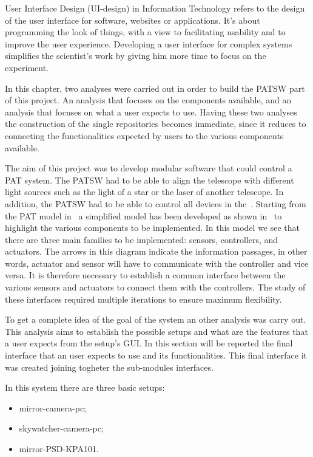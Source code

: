 User Interface Design (UI-design) in Information Technology refers to the design of the user interface for software, websites or applications. It’s about programming the look of things, with a view to facilitating usability and to improve the user experience. Developing a user interface for complex systems simplifies the scientist’s work by giving him more time to focus on the experiment.

In this chapter, two analyses were carried out in order to build the PATSW part of this project. An analysis that focuses on the components available, and an analysis that focuses on what a user expects to use. Having these two analyses the construction of the single repositories becomes immediate, since it reduces to connecting the functionalities expected by users to the various components available.


The aim of this project was to develop modular software that could control a PAT system. The PATSW had to be able to align the telescope with different light sources such as the light of a star or the laser of another telescope.
In addition, the PATSW had to be able to control all devices in the~.
Starting from the PAT model in~ a simplified model has been developed as shown in~ to highlight the various components to be implemented.
In this model we see that there are three main families to be implemented: sensors, controllers, and actuators. The arrows in this diagram indicate the information passages, in other words, actuator and sensor will have to communicate with the controller and vice versa.
It is therefore necessary to establish a common interface between the various sensors and actuators to connect them with the controllers. The study of these interfaces required multiple iterations to ensure maximum flexibility.

To get a complete idea of the goal of the system an other analysis was carry out. This analysis aims to establish the possible setups and what are the features that a user expects from the setup's GUI.
In this section will be reported the final interface that an user expects to use and its functionalities. This final interface it was created joining togheter the sub-modules interfaces.

In this system there are three basic setups:
\begin{itemize}
      \item mirror-camera-pc;
      \item skywatcher-camera-pc;
      \item mirror-PSD-KPA101.
\end{itemize}

